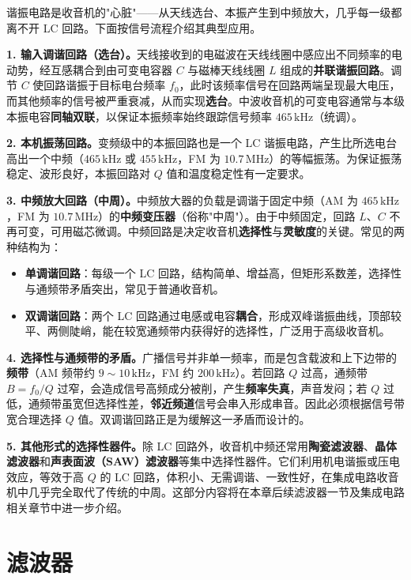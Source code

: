 \documentclass[12pt,UTF8]{ctexbook}
\begin{document}
谐振电路是收音机的"心脏"——从天线选台、本振产生到中频放大，几乎每一级都离不开 LC 回路。下面按信号流程介绍其典型应用。

\textbf{1. 输入调谐回路（选台）。}天线接收到的电磁波在天线线圈中感应出不同频率的电动势，经互感耦合到由可变电容器 $C$ 与磁棒天线线圈 $L$ 组成的\textbf{并联谐振回路}。调节 $C$ 使回路谐振于目标电台频率 $f_0$，此时该频率信号在回路两端呈现最大电压，而其他频率的信号被严重衰减，从而实现\textbf{选台}。中波收音机的可变电容通常与本级本振电容\textbf{同轴双联}，以保证本振频率始终跟踪信号频率 $465\,\mathrm{kHz}$（统调）。

\textbf{2. 本机振荡回路。}变频级中的本振回路也是一个 LC 谐振电路，产生比所选电台高出一个中频（$465\,\mathrm{kHz}$ 或 $455\,\mathrm{kHz}$，FM 为 $10.7\,\mathrm{MHz}$）的等幅振荡。为保证振荡稳定、波形良好，本振回路对 $Q$ 值和温度稳定性有一定要求。

\textbf{3. 中频放大回路（中周）。}中频放大器的负载是调谐于固定中频（AM 为 $465\,\mathrm{kHz}$，FM 为 $10.7\,\mathrm{MHz}$）的\textbf{中频变压器}（俗称"中周"）。由于中频固定，回路 $L$、$C$ 不再可变，可用磁芯微调。中频回路是决定收音机\textbf{选择性}与\textbf{灵敏度}的关键。常见的两种结构为：
\begin{itemize}
  \item \textbf{单调谐回路}：每级一个 LC 回路，结构简单、增益高，但矩形系数差，选择性与通频带矛盾突出，常见于普通收音机。
  \item \textbf{双调谐回路}：两个 LC 回路通过电感或电容\textbf{耦合}，形成双峰谐振曲线，顶部较平、两侧陡峭，能在较宽通频带内获得好的选择性，广泛用于高级收音机。
\end{itemize}

\textbf{4. 选择性与通频带的矛盾。}广播信号并非单一频率，而是包含载波和上下边带的\textbf{频带}（AM 频带约 $9\sim 10\,\mathrm{kHz}$，FM 约 $200\,\mathrm{kHz}$）。若回路 $Q$ 过高，通频带 $B=f_0/Q$ 过窄，会造成信号高频成分被削，产生\textbf{频率失真}，声音发闷；若 $Q$ 过低，通频带虽宽但选择性差，\textbf{邻近频道}信号会串入形成串音。因此必须根据信号带宽合理选择 $Q$ 值。双调谐回路正是为缓解这一矛盾而设计的。

\textbf{5. 其他形式的选择性器件。}除 LC 回路外，收音机中频还常用\textbf{陶瓷滤波器}、\textbf{晶体滤波器}和\textbf{声表面波（SAW）滤波器}等集中选择性器件。它们利用机电谐振或压电效应，等效于高 $Q$ 的 LC 回路，体积小、无需调谐、一致性好，在集成电路收音机中几乎完全取代了传统的中周。这部分内容将在本章后续滤波器一节及集成电路相关章节中进一步介绍。

\section{滤波器}
\label{sec:filter}
\end{document}
